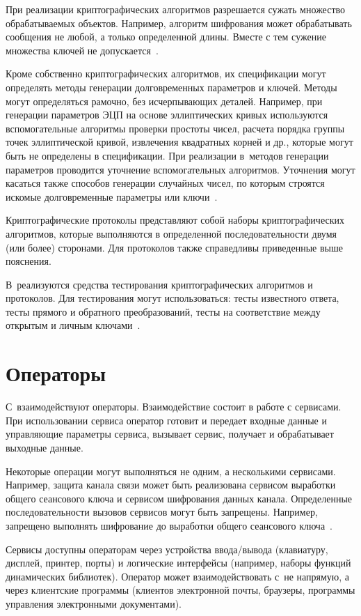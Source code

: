 При реализации криптографических алгоритмов разрешается 
сужать множество обрабатываемых объектов. 
Например, алгоритм шифрования может обрабатывать сообщения не любой,
а только определенной длины.
Вместе с тем сужение множества ключей не допускается~.

Кроме собственно криптографических алгоритмов, их спецификации могут 
определять методы генерации долговременных параметров и ключей.
Методы могут определяться рамочно, без исчерпывающих деталей.
%
Например, при генерации параметров ЭЦП на основе эллиптических кривых 
используются вспомогательные алгоритмы проверки простоты чисел, 
расчета порядка группы точек эллиптической кривой, 
извлечения квадратных корней и др., 
которые могут быть не определены в спецификации.
%
При реализации в~\TOE методов генерации параметров проводится 
уточнение вспомогательных алгоритмов.
%
Уточнения могут касаться также способов генерации случайных чисел,
по которым строятся искомые долговременные параметры или ключи~.

Криптографические протоколы представляют собой наборы 
криптографических алгоритмов, которые выполняются в определенной
последовательности двумя (или более) сторонами. 
Для протоколов также справедливы приведенные выше пояснения.

В~\TOE реализуются средства тестирования криптографических алгоритмов 
и протоколов. Для тестирования могут использоваться:
тесты известного ответа, тесты прямого и обратного преобразований, 
тесты на соответствие между открытым и личным ключами~.

\section{Операторы}

С~\TOE взаимодействуют операторы.
%
Взаимодействие состоит в работе с сервисами.
%
При использовании сервиса оператор 
готовит и передает входные данные и управляющие параметры сервиса,
вызывает сервис, получает и обрабатывает выходные данные.

Некоторые операции могут выполняться не одним, а несколькими сервисами. 
Например, защита канала связи может быть реализована сервисом 
выработки общего сеансового ключа и сервисом шифрования данных канала.
Определенные последовательности вызовов сервисов могут быть запрещены. 
Например, запрещено выполнять шифрование до выработки 
общего сеансового ключа~.

Сервисы доступны операторам через устройства ввода/вывода 
(клавиатуру, дисплей, принтер, порты) и логические интерфейсы
(например, наборы функций динамических библиотек).
%
Оператор может взаимодействовать с~\TOE не напрямую, 
а через клиентские программы (клиентов электронной почты, браузеры, 
программы управления электронными документами). 

